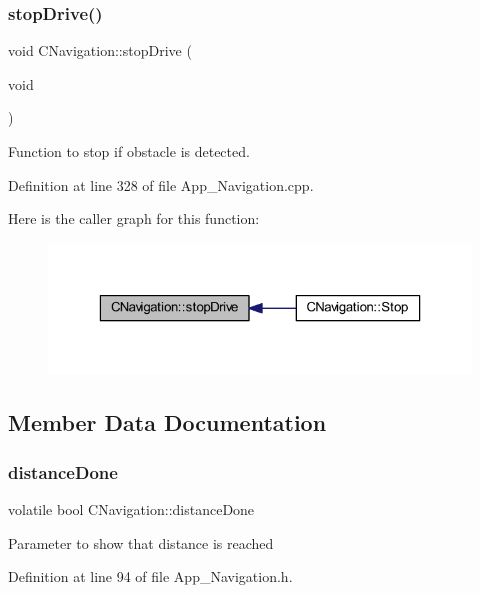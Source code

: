 \subsubsection{\texorpdfstring{stop\+Drive()}{stopDrive()}}
{\footnotesize\ttfamily void C\+Navigation\+::stop\+Drive (\begin{DoxyParamCaption}\item[{void}]{ }\end{DoxyParamCaption})\hspace{0.3cm}{\ttfamily [virtual]}}



Function to stop if obstacle is detected. 



Definition at line 328 of file App\+\_\+\+Navigation.\+cpp.

Here is the caller graph for this function\+:\nopagebreak
\begin{figure}[H]
\begin{center}
\leavevmode
\includegraphics[width=323pt]{class_c_navigation_a06ce71124d487f1f9febf36a0e4b2a5d_icgraph}
\end{center}
\end{figure}


\subsection{Member Data Documentation}
\mbox{\label{class_c_navigation_af3f718b7aa00a149c31c5682113da75e}} 
\subsubsection{\texorpdfstring{distance\+Done}{distanceDone}}
{\footnotesize\ttfamily volatile bool C\+Navigation\+::distance\+Done}

Parameter to show that distance is reached 

Definition at line 94 of file App\+\_\+\+Navigation.\+h.

